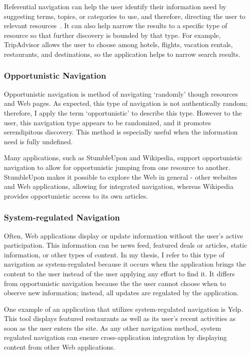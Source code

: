 {{{Referential navigation can help the user identify their information need by suggesting terms, topics, or categories to use, and therefore, directing the user to relevant resources~\cite{levene2011introduction}. It can also help narrow the results to a specific type of resource so that further discovery is bounded by that type. For example, TripAdvisor allows the user to choose among hotels, flights, vacation rentals, restaurants, and destinations, so the application helps to narrow search results.

} %

{\subsubsection{Opportunistic Navigation}
Opportunistic navigation is method of navigating `randomly' though resources and Web pages.  As expected, this type of navigation is not authentically random; therefore, I apply the term `opportunistic' to describe this type. However to the user, this navigation type appears to be randomized, and it promotes serendipitous discovery. This method is especially useful when the information need is fully undefined.

Many applications, such as StumbleUpon and Wikipedia, support opportunistic navigation to allow for opportunistic jumping from one resource to another. StumbleUpon makes it possible to explore the Web in general - other websites and Web applications, allowing for integrated navigation, whereas Wikipedia provides opportunistic access to its own articles. 
} %

{\subsubsection{System-regulated Navigation}
Often, Web applications display or update information without the user's active participation. This information can be news feed, featured deals or articles, static information, or other types of content. In my thesis, I refer to this type of navigation as system-regulated because it occurs when the application brings the content to the user instead of the user applying any effort to find it. It differs from opportunistic navigation because the the user cannot choose when to observe new information; instead, all updates are regulated by the application. 

One example of an application that utilizes system-regulated navigation is Yelp. This tool displays featured restaurants as well as its user's recent activities as soon as the user enters the site. As any other navigation method, system regulated navigation can ensure cross-application integration by displaying content from other Web applications. 
} %
} %

}
